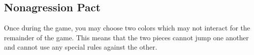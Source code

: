 \documentclass[../rulebook.tex]{subfiles}
\begin{document}
\subsection*{Nonagression Pact}

Once during the game, you may choose two colors which may not interact for the remainder of the game. 
This means that the two pieces cannot jump one another
and cannot use any special rules against the other.
\end{document}
